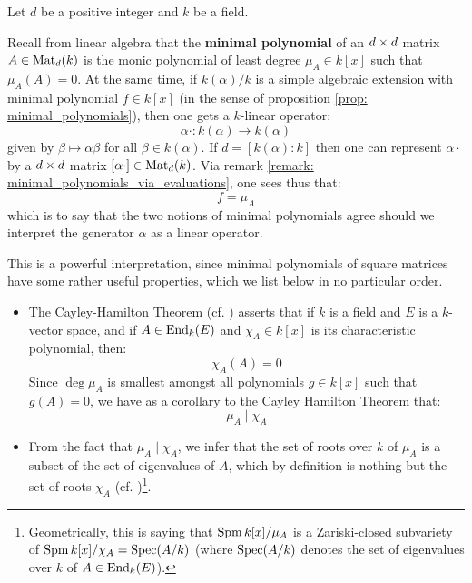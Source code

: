         \begin{remark} \label{remark: minimal_polynomials_of_matrices}
            Let $d$ be a positive integer and $k$ be a field.
            
            Recall from linear algebra that the \textbf{minimal polynomial} of an $d \x d$ matrix $A \in \mathrm{Mat}_d(k)$ is the monic polynomial of least degree $\mu_A \in k[x]$ such that $\mu_A(A) = 0$. At the same time, if $k(\alpha)/k$ is a simple algebraic extension with minimal polynomial $f \in k[x]$ (in the sense of proposition \ref{prop: minimal_polynomials}), then one gets a $k$-linear operator:
                $$\alpha \cdot: k(\alpha) \to k(\alpha)$$
            given by $\beta \mapsto \alpha \beta$ for all $\beta \in k(\alpha)$. If $d = [k(\alpha) : k]$ then one can represent $\alpha \cdot$ by a $d \x d$ matrix $[\alpha \cdot] \in \mathrm{Mat}_d(k)$. Via remark \ref{remark: minimal_polynomials_via_evaluations}, one sees thus that:
                $$f = \mu_A$$
            which is to say that the two notions of minimal polynomials agree should we interpret the generator $\alpha$ as a linear operator.

            This is a powerful interpretation, since minimal polynomials of square matrices have some rather useful properties, which we list below in no particular order.
            \begin{itemize}
                \item The Cayley-Hamilton Theorem (cf. \cite[Theorem V.6.11]{aluffi_chapter_0}) asserts that if $k$ is a field and $E$ is a $k$-vector space, and if $A \in \mathrm{End}_k(E)$ and $\chi_A \in k[x]$ is its characteristic polynomial, then:
                    $$\chi_A(A) = 0$$
                Since $\deg \mu_A$ is smallest amongst all polynomials $g \in k[x]$ such that $g(A) = 0$, we have as a corollary to the Cayley Hamilton Theorem that:
                    $$\mu_A \mid \chi_A$$
                \item From the fact that $\mu_A \mid \chi_A$, we infer that the set of roots over $k$ of $\mu_A$ is a subset of the set of eigenvalues of $A$, which by definition is nothing but the set of roots $\chi_A$ (cf. \cite[Lemma V.6.14]{aluffi_chapter_0})\footnote{Geometrically, this is saying that $\operatorname{Spm} k[x]/\mu_A$ is a Zariski-closed subvariety of $\operatorname{Spm} k[x]/\chi_A = \operatorname{Spec}(A/k)$ (where $\operatorname{Spec}(A/k)$ denotes the set of eigenvalues over $k$ of $A \in \mathrm{End}_k(E)$).}.
                

\end{itemize}
\end{remark}
